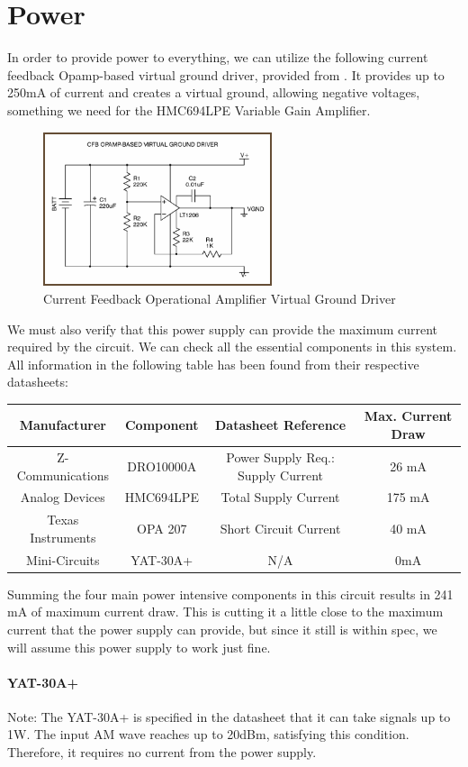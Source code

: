 \section{Power}
In order to provide power to everything, we can utilize the following current feedback Opamp-based virtual ground driver, provided from \cite{TangentSoft}. It provides up to 250mA of current and creates a virtual ground, allowing negative voltages, something we need for the HMC694LPE Variable Gain Amplifier. 

\begin{figure}[H]
    \centering
    \includegraphics[width = 0.6\textwidth]{Images/cfb-opa.png}
    \caption{Current Feedback Operational Amplifier Virtual Ground Driver}
    \label{fig:cfbopa}
\end{figure}

We must also verify that this power supply can provide the maximum current required by the circuit. We can check all the essential components in this system. All information in the following table has been found from their respective datasheets:


\begin{tabular}{||c|c|c|c||}
    \cline{1-2}
    Manufacturer & Component & Datasheet Reference & Max. Current Draw\\
    \hline \hline
     Z-Communications & DRO10000A & Power Supply Req.: Supply Current & 26 mA \\
    \hline
     Analog Devices & HMC694LPE & Total Supply Current & 175 mA \\
    \hline
     Texas Instruments & OPA 207 & Short Circuit Current & 40 mA \\
    \hline
     Mini-Circuits & YAT-30A+ & N/A & 0mA \\
    \cline{3-4}
\end{tabular}

Summing the four main power intensive components in this circuit results in 241 mA of maximum current draw. This is cutting it a little close to the maximum current that the power supply can provide, but since it still is within spec, we will assume this power supply to work just fine.

\paragraph{YAT-30A+}
Note: The YAT-30A+ is specified in the datasheet that it can take signals up to 1W. The input AM wave reaches up to 20dBm, satisfying this condition. Therefore, it requires no current from the power supply.